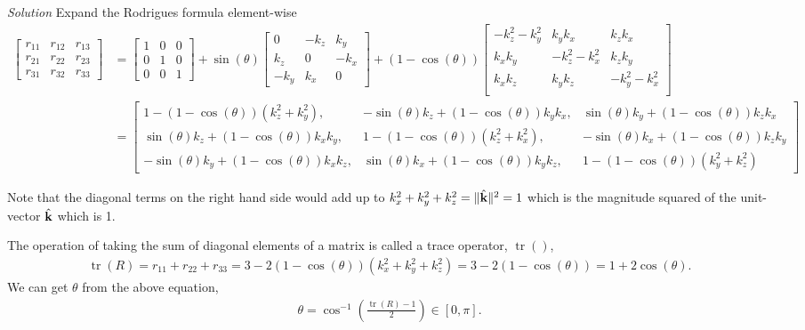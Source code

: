 \documentclass{article}
\DeclareMathOperator{\tr}{tr}
\numberwithin{prob}{section}
\newenvironment{solution}{\emph{Solution}}{}
\begin{document}
\begin{solution}
Expand the Rodrigues formula element-wise
\begin{align}
  \begin{bmatrix}
    r_{11} & r_{12} & r_{13}  \\
    r_{21} & r_{22} & r_{23}  \\
    r_{31} & r_{32} & r_{33}  
  \end{bmatrix}
  &= \begin{bmatrix}
    1 & 0 & 0\\
    0 & 1 & 0\\
    0 & 0 & 1
  \end{bmatrix}
  + \sin(\theta)
  \begin{bmatrix}
    0 & -k_z & k_y\\
    k_z & 0 & -k_x\\
    -k_y & k_x & 0
  \end{bmatrix}
  + (1-\cos(\theta))
  \begin{bmatrix}
    -k_z^2 - k_y^2 & k_y k_x & k_z k_x \\
    k_x k_y & -k_z^2 - k_x^2 & k_z k_y \\
    k_x k_z &  k_y k_z & -k_y^2 - k_x^2\\
  \end{bmatrix}\\
  &=\begin{bmatrix}
    1-(1-\cos(\theta))(k_z^2 + k_y^2), &
    - \sin(\theta) k_z + (1-\cos(\theta)) k_y k_x, &
    \sin(\theta) k_y + (1-\cos(\theta)) k_z k_x \\
    \sin(\theta) k_z + (1-\cos(\theta)) k_x k_y, &
    1-(1-\cos(\theta))(k_z^2 + k_x^2) , &
    -\sin(\theta) k_x + (1-\cos(\theta)) k_z k_y \\
    -\sin(\theta) k_y + (1-\cos(\theta)) k_x k_z, &
    \sin(\theta) k_x + (1-\cos(\theta)) k_y k_z, &
    1-(1-\cos(\theta))(k_y^2 + k_z^2)
  \end{bmatrix}
  \label{eq:rod-exp}
\end{align}

Note that the diagonal terms on the right hand side would add up to $k_x^2 + k_y^2 + k_z^2 = \|\hat{\mathbf{k}}\|^2 = 1$ which is the magnitude squared of the unit-vector $\hat{\mathbf{k}}$ which is 1.

The operation of taking the sum of diagonal elements of a matrix is called a trace operator, $\tr()$, 
\begin{align}
  \tr(R) = r_{11} + r_{22} + r_{33} = 3 - 2(1-\cos(\theta)) (k_x^2 + k_y^2 + k_z^2) = 3 - 2(1-\cos(\theta)) = 1 + 2\cos(\theta).
\end{align}
We can get $\theta$ from the above equation,
\begin{align}
  \theta = \cos^{-1}\left(\frac{\tr(R) - 1}{2}\right) \in [0, \pi].
\end{align}


\end{solution}
\end{document}
